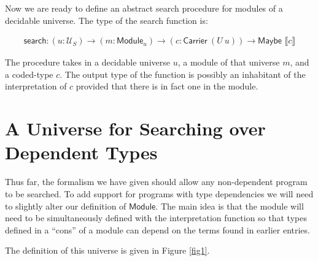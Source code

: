 \documentclass[acmsmall,review,authorversion]{acmart}
\newcommand{\term}[1]{\textsf{#1}}
\newcommand{\Carrier}{\term{Carrier}}
\newcommand{\Universe}{\mathcal{U}}
\newcommand{\Interp}[1]{\llbracket #1 \rrbracket}
\newcommand{\?}{\stackrel{?}{\approx}}
\newcommand{\search}{\term{search}}
\begin{document}
Now we are ready to define an abstract search procedure for modules of a
decidable universe. The type of the search function is:

$$
\begin{array}{l}
  \search : (u : \Universe_S) \rightarrow (m : \textsf{Module}_u)\rightarrow (c : \Carrier\ (U\ u))
  \rightarrow \textsf{Maybe }\Interp{c}
\end{array}
$$

The procedure takes in a decidable universe $u$, a module of that universe $m$,
and a coded-type $c$. The output type of the function is possibly an inhabitant
of the interpretation of $c$ provided that there is in fact one in the module.

\section{A Universe for Searching over Dependent Types} 

Thus far, the formalism we have given should allow any non-dependent program
to be searched. To add support for programs with type dependencies we will need
to slightly alter our definition of $\textsf{Module}$. The main idea is that the
module will need to be simultaneously defined with the interpretation function
so that types defined in a ``cons'' of a module can depend on the terms found in
earlier entries. 

The definition of this universe is given in Figure \ref{fig1}.
\end{document}
